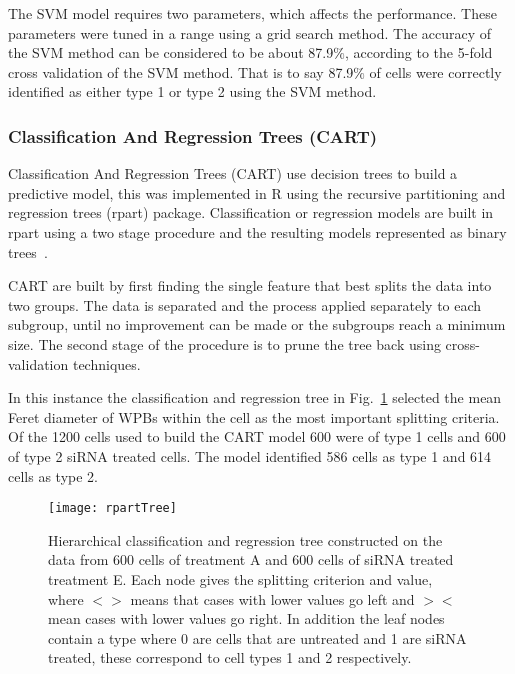The SVM model requires two parameters, which affects the performance. These parameters were tuned in a range using a grid search method. The accuracy of the SVM method can be considered to be about 87.9$\%$, according to the 5-fold cross validation of the SVM method. That is to say 87.9$\%$ of cells were correctly identified as either type 1 or type 2 using the SVM method.

\subsubsection{Classification And Regression Trees (CART)}
Classification And Regression Trees (CART) use decision trees to build a predictive model, this was implemented in R using the recursive partitioning and regression trees (rpart) package. Classification or regression models are built in rpart using a two stage procedure and the resulting models represented as binary trees~\cite{Duda2000}.

CART are built by first finding the single feature that best splits the data into two groups. The data is separated and the process applied separately to each subgroup, until no improvement can be made or the subgroups reach a minimum size. The second stage of the procedure is to prune the tree back using cross-validation techniques.

In this instance the classification and regression tree in Fig.~\ref{fig:CARTtree} selected the mean Feret diameter of WPBs within the cell as the most important splitting criteria. Of the 1200 cells used to build the CART model 600 were of type 1 cells and 600 of type 2 siRNA treated cells. The model identified 586 cells as type 1 and 614 cells as type 2.

\begin{figure}[!htbp]
	\texttt{[image: rpartTree]} 
	\caption{Hierarchical classification and regression tree constructed on the data from 600 cells of treatment A and 600 cells of siRNA treated treatment E. Each node gives the splitting criterion and value, where $<>$ means that cases with lower values go left and $><$ mean cases with lower values go right. In addition the leaf nodes contain a type where 0 are cells that are untreated and 1 are siRNA treated, these correspond to cell types 1 and 2 respectively.}
	\label{fig:CARTtree} 
\end{figure} 

